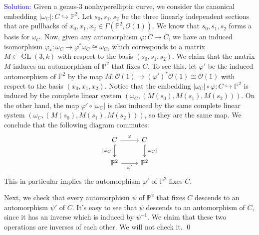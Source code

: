\documentclass[11pt]{article}
\newcommand{\PP}{\mathbb{P}}
\newcommand{\cO}{\mathcal{O}}
\newcommand{\GL}{\operatorname{GL}}
\newenvironment{solution}{\begin{trivlist}\item[]{\textcolor{blue}{Solution:}}}{\qed \end{trivlist}}
\begin{document}
\begin{solution}
    Given a genus-3 nonhyperelliptic curve, we consider the canonical embedding $|\omega_C|: C \hookrightarrow \PP^2$. Let $s_0, s_1, s_2$ be the three linearly independent sections that are pullbacks of $x_0, x_1, x_2 \in \Gamma(\PP^2, \cO(1))$. We know that $s_0, s_1, s_2$ forms a basis for $\omega_C$. Now, given any automorphism $\varphi: C \rightarrow C$, we have an induced isomorphism $\varphi_*: \omega_C \rightarrow \varphi^*\omega_C \cong \omega_C$, which corresponds to a matrix $M \in \GL(3, k)$ with respect to the basis $(s_0, s_1, s_2)$. We claim that the matrix $M$ induces an automorphism of $\PP^2$ that fixes $C$. To see this, let $\varphi'$ be the induced automorphism of $\PP^2$ by the map $M: \cO(1) \rightarrow (\varphi')^*\cO(1) \cong \cO(1)$ with respect to the basis $(x_0, x_1, x_2)$. Notice that the embedding $|\omega_C| \circ \varphi: C \hookrightarrow \PP^2$ is induced by the complete linear system $(\omega_C, (M(s_0), M(s_1), M(s_2)))$. On the other hand, the map $\varphi' \circ |\omega_C|$ is also induced by the same complete linear system $(\omega_C, (M(s_0), M(s_1), M(s_2)))$, so they are the same map. We conclude that the following diagram commutes:
    \[\begin{tikzcd}
        C & C \\
        {\PP^2} & {\PP^2}
        \arrow["\varphi", from=1-1, to=1-2]
        \arrow["{|\omega_C|}"', hook, from=1-1, to=2-1]
        \arrow["{|\omega_C|}", hook, from=1-2, to=2-2]
        \arrow["{\varphi'}"', from=2-1, to=2-2]
    \end{tikzcd}\]
    This in particular implies the automorphism $\varphi'$ of $\PP^2$ fixes $C$. 

    Next, we check that every automorphism $\psi$ of $\PP^2$ that fixes $C$ descends to an automorphism $\psi'$ of $C$. It's easy to see that $\psi$ descends to an automorphism of $C$, since it has an inverse which is induced by $\psi^{-1}$. We claim that these two operations are inverses of each other. We will not check it. 
\end{solution}

\end{document}
